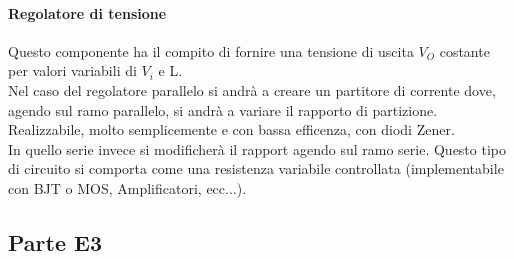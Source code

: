 \documentclass[12pt]{article}
\begin{document}
\paragraph{Regolatore di tensione} Questo componente ha il compito di fornire una tensione di uscita $V_{O}$ costante per valori variabili di $V_{i}$ e L.\\
Nel caso del regolatore parallelo si andrà a creare un partitore di corrente dove, agendo sul ramo parallelo, si andrà a variare il rapporto di partizione. Realizzabile, molto semplicemente e con bassa efficenza, con diodi Zener.\\
In quello serie invece si modificherà il rapport agendo sul ramo serie. Questo tipo di circuito si comporta come una resistenza variabile controllata (implementabile con BJT o MOS, Amplificatori, ecc...).

\subsection{Parte E3}\label{e3} %




\end{document}
